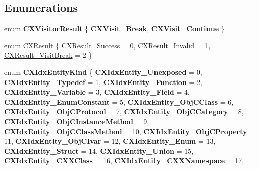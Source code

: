 \subsection*{Enumerations}
\begin{DoxyCompactItemize}
\item 
\mbox{\label{group__CINDEX__HIGH_ga4b763faa98fe78195c06f74745a1e6b4}} 
enum {\bfseries C\+X\+Visitor\+Result} \{ {\bfseries C\+X\+Visit\+\_\+\+Break}, 
{\bfseries C\+X\+Visit\+\_\+\+Continue}
 \}
\item 
enum \hyperlink{group__CINDEX__HIGH_ga59185777d9788da5d983cc0c7c8977bf}{C\+X\+Result} \{ \hyperlink{group__CINDEX__HIGH_gga59185777d9788da5d983cc0c7c8977bfadc04f4b21eabbddf3465b4e8cf684b97}{C\+X\+Result\+\_\+\+Success} = 0, 
\hyperlink{group__CINDEX__HIGH_gga59185777d9788da5d983cc0c7c8977bfafeb3e2b0d7128e99709d10d5ced9470b}{C\+X\+Result\+\_\+\+Invalid} = 1, 
\hyperlink{group__CINDEX__HIGH_gga59185777d9788da5d983cc0c7c8977bfa1a0d552a23b857cb129e0211bc9fb1dd}{C\+X\+Result\+\_\+\+Visit\+Break} = 2
 \}
\item 
\mbox{\label{group__CINDEX__HIGH_gaeabdc51cf762443531dfdd92b0e15b04}} 
enum {\bfseries C\+X\+Idx\+Entity\+Kind} \{ \newline
{\bfseries C\+X\+Idx\+Entity\+\_\+\+Unexposed} = 0, 
{\bfseries C\+X\+Idx\+Entity\+\_\+\+Typedef} = 1, 
{\bfseries C\+X\+Idx\+Entity\+\_\+\+Function} = 2, 
{\bfseries C\+X\+Idx\+Entity\+\_\+\+Variable} = 3, 
\newline
{\bfseries C\+X\+Idx\+Entity\+\_\+\+Field} = 4, 
{\bfseries C\+X\+Idx\+Entity\+\_\+\+Enum\+Constant} = 5, 
{\bfseries C\+X\+Idx\+Entity\+\_\+\+Obj\+C\+Class} = 6, 
{\bfseries C\+X\+Idx\+Entity\+\_\+\+Obj\+C\+Protocol} = 7, 
\newline
{\bfseries C\+X\+Idx\+Entity\+\_\+\+Obj\+C\+Category} = 8, 
{\bfseries C\+X\+Idx\+Entity\+\_\+\+Obj\+C\+Instance\+Method} = 9, 
{\bfseries C\+X\+Idx\+Entity\+\_\+\+Obj\+C\+Class\+Method} = 10, 
{\bfseries C\+X\+Idx\+Entity\+\_\+\+Obj\+C\+Property} = 11, 
\newline
{\bfseries C\+X\+Idx\+Entity\+\_\+\+Obj\+C\+Ivar} = 12, 
{\bfseries C\+X\+Idx\+Entity\+\_\+\+Enum} = 13, 
{\bfseries C\+X\+Idx\+Entity\+\_\+\+Struct} = 14, 
{\bfseries C\+X\+Idx\+Entity\+\_\+\+Union} = 15, 
\newline
{\bfseries C\+X\+Idx\+Entity\+\_\+\+C\+X\+X\+Class} = 16, 
{\bfseries C\+X\+Idx\+Entity\+\_\+\+C\+X\+X\+Namespace} = 17, 

\end{DoxyCompactItemize}
